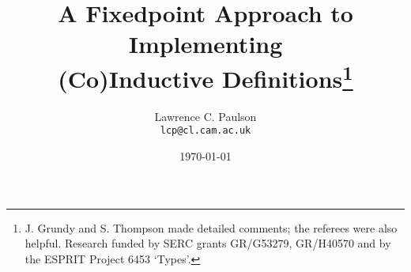 \newif\ifCADE
\CADEtrue

\title{A Fixedpoint Approach to Implementing\\ 
  (Co)Inductive Definitions\thanks{J. Grundy and S. Thompson made detailed
    comments; the referees were also helpful.  Research funded by
    SERC grants GR/G53279, GR/H40570 and by the ESPRIT Project 6453
    `Types'.}}

\author{Lawrence C. Paulson\\{\tt lcp@cl.cam.ac.uk}}
\date{\today} 
\setcounter{secnumdepth}{2} \setcounter{tocdepth}{2}

\newcommand\sbs{\subseteq}
\let\To=\Rightarrow


\newcommand\pow{{\cal P}}
\newcommand\RepFun{\hbox{\tt RepFun}}
\newcommand\cons{\hbox{\tt cons}}
\def\succ{\hbox{\tt succ}}
\newcommand\split{\hbox{\tt split}}
\newcommand\fst{\hbox{\tt fst}}
\newcommand\snd{\hbox{\tt snd}}
\newcommand\converse{\hbox{\tt converse}}
\newcommand\domain{\hbox{\tt domain}}
\newcommand\range{\hbox{\tt range}}
\newcommand\field{\hbox{\tt field}}
\newcommand\lfp{\hbox{\tt lfp}}
\newcommand\gfp{\hbox{\tt gfp}}
\newcommand\id{\hbox{\tt id}}
\newcommand\trans{\hbox{\tt trans}}
\newcommand\wf{\hbox{\tt wf}}
\newcommand\nat{\hbox{\tt nat}}
\newcommand\rank{\hbox{\tt rank}}
\newcommand\univ{\hbox{\tt univ}}
\newcommand\Vrec{\hbox{\tt Vrec}}
\newcommand\Inl{\hbox{\tt Inl}}
\newcommand\Inr{\hbox{\tt Inr}}
\newcommand\case{\hbox{\tt case}}
\newcommand\lst{\hbox{\tt list}}
\newcommand\Nil{\hbox{\tt Nil}}
\newcommand\Cons{\hbox{\tt Cons}}
\newcommand\lstcase{\hbox{\tt list\_case}}
\newcommand\lstrec{\hbox{\tt list\_rec}}
\newcommand\length{\hbox{\tt length}}
\newcommand\listn{\hbox{\tt listn}}
\newcommand\acc{\hbox{\tt acc}}
\newcommand\primrec{\hbox{\tt primrec}}
\newcommand\SC{\hbox{\tt SC}}
\newcommand\CONST{\hbox{\tt CONST}}
\newcommand\PROJ{\hbox{\tt PROJ}}
\newcommand\COMP{\hbox{\tt COMP}}
\newcommand\PREC{\hbox{\tt PREC}}

\newcommand\quniv{\hbox{\tt quniv}}
\newcommand\llist{\hbox{\tt llist}}
\newcommand\LNil{\hbox{\tt LNil}}
\newcommand\LCons{\hbox{\tt LCons}}
\newcommand\lconst{\hbox{\tt lconst}}
\newcommand\lleq{\hbox{\tt lleq}}
\newcommand\map{\hbox{\tt map}}
\newcommand\term{\hbox{\tt term}}
\newcommand\Apply{\hbox{\tt Apply}}
\newcommand\termcase{\hbox{\tt term\_case}}
\newcommand\rev{\hbox{\tt rev}}
\newcommand\reflect{\hbox{\tt reflect}}
\newcommand\tree{\hbox{\tt tree}}
\newcommand\forest{\hbox{\tt forest}}
\newcommand\Part{\hbox{\tt Part}}
\newcommand\TF{\hbox{\tt tree\_forest}}
\newcommand\Tcons{\hbox{\tt Tcons}}
\newcommand\Fcons{\hbox{\tt Fcons}}
\newcommand\Fnil{\hbox{\tt Fnil}}
\newcommand\TFcase{\hbox{\tt TF\_case}}
\newcommand\Fin{\hbox{\tt Fin}}
\newcommand\QInl{\hbox{\tt QInl}}
\newcommand\QInr{\hbox{\tt QInr}}
\newcommand\qsplit{\hbox{\tt qsplit}}
\newcommand\qcase{\hbox{\tt qcase}}
\newcommand\Con{\hbox{\tt Con}}
\newcommand\data{\hbox{\tt data}}

